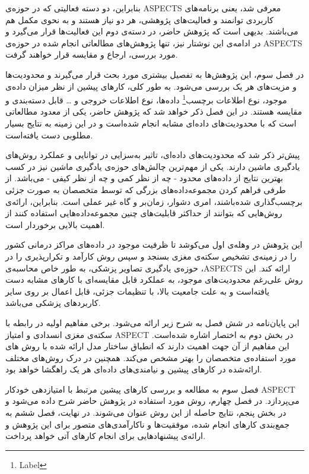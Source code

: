 بنابراین، دو دسته فعالیتی که در حوزه‌ی ASPECTS معرفی شد، یعنی برنامه‌های کاربردی توانمند و فعالیت‌های پژوهشی، هر دو نیاز هستند و به نحوی مکمل هم می‌باشند.
بدیهی‌ است که پژوهش حاضر، در دسته‌ی دوم این فعالیت‌ها قرار می‌گیرد
و در ادامه‌ی این نوشتار نیز، تنها پژوهش‌های مطالعاتی انجام شده در حوزه‌ی ASPECTS مورد بررسی، ارجاع و مقایسه قرار خواهند گرفت.

در فصل سوم، این پژوهش‌ها به تفصیل بیشتری مورد 
بحث قرار می‌‌گیرند و
محدودیت‌ها و مزیت‌های هر یک بررسی می‌شود.
به طور کلی، کار‌های پیشین از نظر میزان داده‌ی موجود، نوع اطلاعات 
برچسب\footnote{Label}
داده‌ها،
نوع اطلاعات خروجی و
\dots 
قابل دسته‌بندی و مقایسه هستند.
در این فصل ذکر خواهد شد که پژوهش حاضر، یکی از معدود مطالعاتی است که با محدودیت‌های داده‌ای مشابه انجام شده‌است و 
در این زمینه به نتایج بسیار مطلوبی دست یافته‌است.


پیش‌تر ذکر شد که محدودیت‌های داده‌ای، تاثیر به‌سزایی در توانایی و عملکرد روش‌های یادگیری ماشین دارند.
یکی از مهم‌ترین چالش‌های حوزه‌ی یادگیری ماشین نیز در کسب بهترین نتایج از داده‌های محدود - چه از نظر کمی و چه از نظر کیفی - می‌باشد.
از طرفی فراهم کردن مجموعه‌داده‌های بزرگی که توسط متخصصان به صورت جزئی برچسب‌گذاری شده‌باشند، امری دشوار، زمان‌بر و گاه غیر عملی است.
بنابراین، ارائه‌ی روش‌هایی که بتوانند از حداکثر قابلیت‌های چنین مجموعه‌داده‌هایی استفاده کنند از اهمیت بالایی برخوردار است.

این پژوهش در وهله‌ی اول می‌کوشد تا ظرفیت موجود در داده‌های مراکز درمانی کشور را در زمینه‌ی تشخیص سکته‌ی مغزی بسنجد و سپس روش کارآمد و تکرارپذیری را در حوزه‌ی یادگیری تصاویر پزشکی، به طور خاص محاسبه‌ی ،ASPECTS ارائه کند.
این روش علی‌رغم محدودیت‌های موجود، به عملکرد قابل مقایسه‌ای با کارهای مشابه دست یافته‌است و
به علت جامعیت بالا، با تنظیمات جزئی، قابل اعمال بر روی سایر کاربرد‌های پزشکی می‌باشد.



این پایان‌نامه در شش فصل به شرح زیر ارائه می‌شود.
برخی مفاهیم اولیه در رابطه با سکته‌ی مغزی انسدادی و امتیاز ASPECT در بخش دوم به اختصار اشاره شده‌است.
این مفاهیم از آن جهت اهمیت دارند که انطباق ساختار مدل ارائه شده با روش های مورد استفاده‌ی متخصصان را بهتر مشخص می‌کند.
همچنین در درک روش‌های مختلف ارائه‌شده در کارهای پیشین و نیامندی‌های داده‌ای هر یک راهگشا خواهد بود.

فصل سوم به مطالعه و بررسی کارهای پیشین مرتبط با امتیاز‌دهی خودکار ASPECT می‌پردازد.
در فصل چهارم، روش مورد استفاده در پژوهش حاضر شرح داده می‌شود 
و در بخش پنجم، نتایج حاصله از این روش عنوان می‌شوند.
در نهایت،‌ فصل ششم به جمع‌بندی کارهای انجام شده، موفقیت‌ها و ناکارآمدی‌های متصور برای این پژوهش و ارائه‌ی پیشنهادهایی برای انجام کارهای آتی خواهد پرداخت.